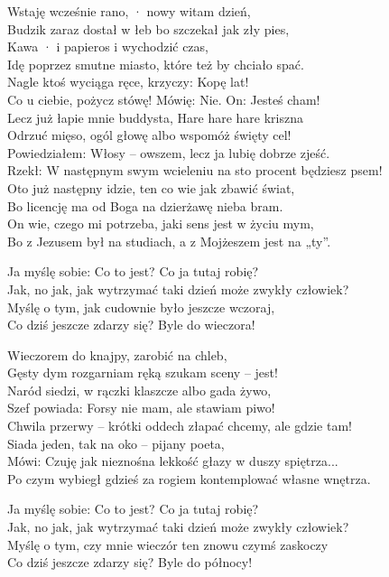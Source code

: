 \begin{text}
\small{
Wstaję wcześnie rano, · nowy witam dzień,\\
Budzik zaraz dostał w łeb bo szczekał jak zły pies,\\
Kawa · i papieros i wychodzić czas,\\
Idę poprzez smutne miasto, które też by chciało spać.\\
Nagle ktoś wyciąga ręce, krzyczy: Kopę lat!\\
Co u ciebie, pożycz stówę! Mówię: Nie. On: Jesteś cham!\\
Lecz już łapie mnie buddysta, Hare hare hare kriszna\\
Odrzuć mięso, ogól głowę albo wspomóż święty cel!\\
Powiedziałem: Włosy – owszem, lecz ja lubię dobrze zjeść.\\
Rzekł: W następnym swym wcieleniu na sto procent będziesz psem!\\
Oto już następny idzie, ten co wie jak zbawić świat,\\
Bo licencję ma od Boga na dzierżawę nieba bram.\\
On wie, czego mi potrzeba, jaki sens jest w życiu mym,\\
Bo z Jezusem był na studiach, a z Mojżeszem jest na „ty”.

Ja myślę sobie: Co to jest? Co ja tutaj robię?\\
Jak, no jak, jak wytrzymać taki dzień może zwykły człowiek?\\
Myślę o tym, jak cudownie było jeszcze wczoraj,\\
Co dziś jeszcze zdarzy się? Byle do wieczora!

Wieczorem do knajpy, zarobić na chleb,\\
Gęsty dym rozgarniam ręką szukam sceny – jest!\\
Naród siedzi, w rączki klaszcze albo gada żywo,\\
Szef powiada: Forsy nie mam, ale stawiam piwo!\\
Chwila przerwy – krótki oddech złapać chcemy, ale gdzie tam!\\
Siada jeden, tak na oko – pijany poeta,\\
Mówi: Czuję jak nieznośna lekkość głazy w duszy spiętrza...\\
Po czym wybiegł gdzieś za rogiem kontemplować własne wnętrza.

Ja myślę sobie: Co to jest? Co ja tutaj robię?\\
Jak, no jak, jak wytrzymać taki dzień może zwykły człowiek?\\
Myślę o tym, czy mnie wieczór ten znowu czymś zaskoczy\\
Co dziś jeszcze zdarzy się? Byle do północy!

}
\end{text}
